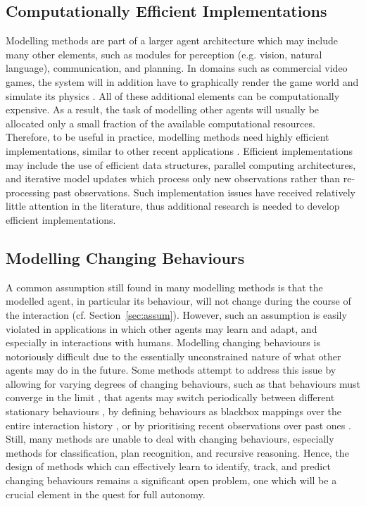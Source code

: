 \documentclass[final,1p,times,authoryear]{elsarticle}
\begin{document}
		\subsection{Computationally Efficient Implementations}

Modelling methods are part of a larger agent architecture which may include many other elements, such as modules for perception (e.g. vision, natural language), communication, and planning. In domains such as commercial video games, the system will in addition have to graphically render the game world and simulate its physics \citep{m2009}. All of these additional elements can be computationally expensive. As a result, the task of modelling other agents will usually be allocated only a small fraction of the available computational resources. Therefore, to be useful in practice, modelling methods need highly efficient implementations, similar to other recent applications \citep{alphago2016,bbjt2015}. Efficient implementations may include the use of efficient data structures, parallel computing architectures, and iterative model updates which process only new observations rather than re-processing past observations. Such implementation issues have received relatively little attention in the literature, thus additional research is needed to develop efficient implementations.


		\subsection{Modelling Changing Behaviours}

A common assumption still found in many modelling methods is that the modelled agent, in particular its behaviour, will not change during the course of the interaction (cf. Section~\ref{sec:assum}). However, such an assumption is easily violated in applications in which other agents may learn and adapt, and especially in interactions with humans. Modelling changing behaviours is notoriously difficult due to the essentially unconstrained nature of what other agents may do in the future. Some methods attempt to address this issue by allowing for varying degrees of changing behaviours, such as that behaviours must converge in the limit \citep{cs2007}, that agents may switch periodically between different stationary behaviours \citep{hzt2017,bb2007}, by defining behaviours as blackbox mappings over the entire interaction history \citep{acr2016aij}, or by prioritising recent observations over past ones \citep{ar2013,bdsb2004}. Still, many methods are unable to deal with changing behaviours, especially methods for classification, plan recognition, and recursive reasoning. Hence, the design of methods which can effectively learn to identify, track, and predict changing behaviours remains a significant open problem, one which will be a crucial element in the quest for full autonomy.
\end{document}

